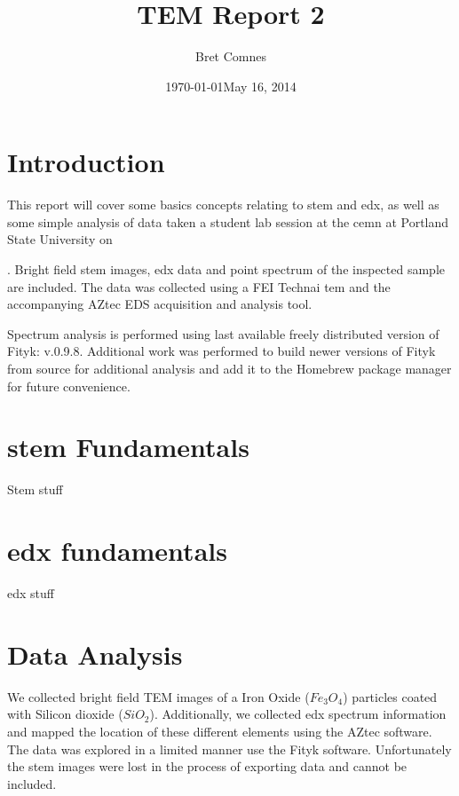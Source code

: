 \documentclass[12pt]{article} %
\title{TEM Report 2}
\author{Bret Comnes}
\date{\today}
\begin{document}
\maketitle

\section{Introduction} %

This report will cover some basics concepts relating to \ac{stem} and \ac{edx}, as well as some simple analysis of data taken a student lab session at the \ac{cemn} at Portland State University on \date{May 16, 2014}.  Bright field \ac{stem} images, \ac{edx} data and point spectrum of the inspected sample are included.  The data was collected using a FEI Technai \ac{tem} and the accompanying AZtec EDS acquisition and analysis tool.

Spectrum analysis is performed using last available freely distributed version of Fityk\cite{ft}: v.0.9.8.  Additional work was performed to build newer versions of Fityk from source for additional analysis  and add it to the Homebrew\cite{HB} package manager for future convenience.


\section{\ac{stem} Fundamentals} %
\label{sec:stem}

Stem stuff



\section{\ac{edx} fundamentals} %
\label{sec:edx}

edx stuff


\section{Data Analysis} %
\label{sec:data_analysis}

We collected bright field TEM images of a Iron Oxide ($Fe_3O_4$) particles coated with Silicon dioxide ($SiO_2$).  Additionally, we collected \ac{edx} spectrum information and mapped the location of these different elements using the AZtec software.  The data was explored in a limited manner use the Fityk software.  Unfortunately the \ac{stem} images were lost in the process of exporting data and cannot be included.
\end{document}
